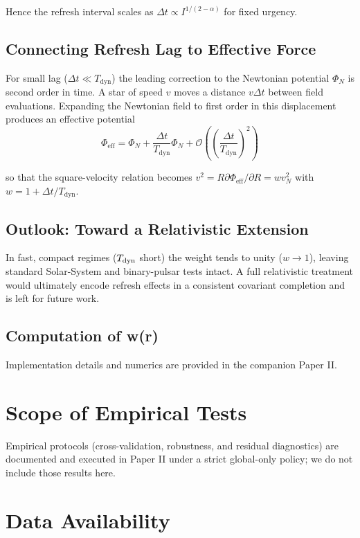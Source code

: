 \documentclass[usenatbib]{mnras}
\begin{document}
Hence the refresh interval scales as $\Delta t \propto I^{1/(2-\alpha)}$ for fixed urgency.

\subsection{Connecting Refresh Lag to Effective Force}

For small lag ($\Delta t \ll T_{\text{dyn}}$) the leading correction to the Newtonian potential $\Phi_N$ is second order in time. A star of speed $v$ moves a distance $v\Delta t$ between field evaluations. Expanding the Newtonian field to first order in this displacement produces an effective potential
\begin{equation}
\Phi_{\text{eff}} = \Phi_N + \frac{\Delta t}{T_{\text{dyn}}} \Phi_N + \mathcal{O}\left(\left(\frac{\Delta t}{T_{\text{dyn}}}\right)^2\right)
\end{equation}

so that the square-velocity relation becomes $v^2 = R \partial\Phi_{\text{eff}}/\partial R = w v_N^2$ with $w = 1 + \Delta t/T_{\text{dyn}}$.

\subsection{Outlook: Toward a Relativistic Extension}

In fast, compact regimes ($T_{\rm dyn}$ short) the weight tends to unity ($w\to 1$), leaving standard Solar-System and binary-pulsar tests intact. A full relativistic treatment would ultimately encode refresh effects in a consistent covariant completion and is left for future work.

\subsection{Computation of w(r)}

Implementation details and numerics are provided in the companion Paper II.

\section{Scope of Empirical Tests}
Empirical protocols (cross-validation, robustness, and residual diagnostics) are documented and executed in Paper II under a strict global-only policy; we do not include those results here.

\section*{Data Availability}
\end{document}
